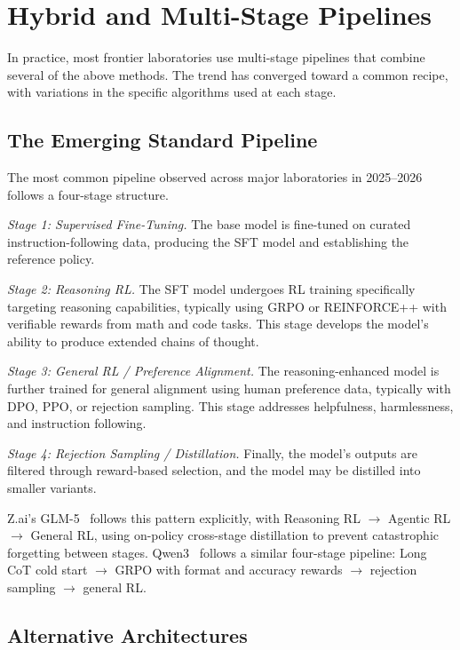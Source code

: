 \documentclass[12pt]{article}
\begin{document}
\section{Hybrid and Multi-Stage Pipelines}

In practice, most frontier laboratories use multi-stage pipelines that combine several of the above methods. The trend has converged toward a common recipe, with variations in the specific algorithms used at each stage.

\subsection{The Emerging Standard Pipeline}

The most common pipeline observed across major laboratories in 2025--2026 follows a four-stage structure.

\textit{Stage 1: Supervised Fine-Tuning.} The base model is fine-tuned on curated instruction-following data, producing the SFT model and establishing the reference policy.

\textit{Stage 2: Reasoning RL.} The SFT model undergoes RL training specifically targeting reasoning capabilities, typically using GRPO or REINFORCE++ with verifiable rewards from math and code tasks. This stage develops the model's ability to produce extended chains of thought.

\textit{Stage 3: General RL / Preference Alignment.} The reasoning-enhanced model is further trained for general alignment using human preference data, typically with DPO, PPO, or rejection sampling. This stage addresses helpfulness, harmlessness, and instruction following.

\textit{Stage 4: Rejection Sampling / Distillation.} Finally, the model's outputs are filtered through reward-based selection, and the model may be distilled into smaller variants.

Z.ai's GLM-5~\cite{GLM2025GLM5} follows this pattern explicitly, with Reasoning RL $\rightarrow$ Agentic RL $\rightarrow$ General RL, using on-policy cross-stage distillation to prevent catastrophic forgetting between stages. Qwen3~\cite{Qwen2025Qwen3} follows a similar four-stage pipeline: Long CoT cold start $\rightarrow$ GRPO with format and accuracy rewards $\rightarrow$ rejection sampling $\rightarrow$ general RL.

\subsection{Alternative Architectures}
\end{document}
